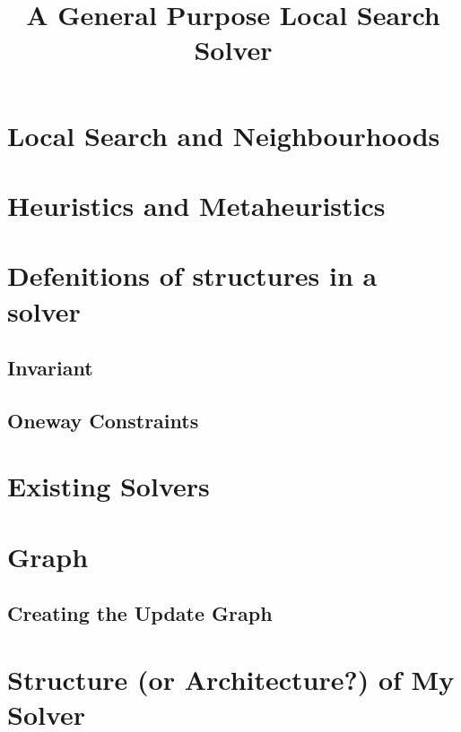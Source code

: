 \documentclass[a4paper,10pt]{article}
\title{A General Purpose Local Search Solver}
\begin{document}
\maketitle

\section{Local Search and Neighbourhoods}
\section{Heuristics and Metaheuristics}
\section{Defenitions of structures in a solver}

\subsection{Invariant}

\subsection{Oneway Constraints}

\section{Existing Solvers}



\section{Graph}

\subsection{Creating the Update Graph} \label{updategraph}

\section{Structure (or Architecture?) of My Solver}

\end{document}
